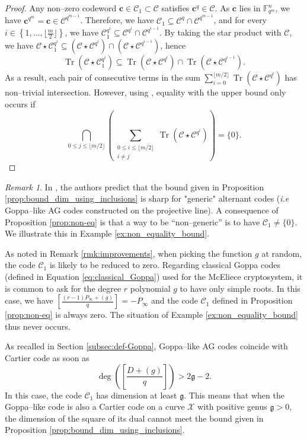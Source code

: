 \documentclass[lettersize,journal]{IEEEtran}
\theoremstyle{plain}
\theoremstyle{definition}
\theoremstyle{remark}
\newtheorem{remark}[thm]{Remark}
\DeclareMathOperator{\trace}{Tr}
\newcommand{\calC}{\mathcal{C}}
\newcommand{\calX}{\mathcal{X}}
\newcommand{\fqm}{\mathbb{F}_{q^m}}
\newcommand{\Tr}[1]{\trace\!\left(#1\right)}
\newcommand{\set}[1]{\left\{#1\right\}}
\begin{document}
	\begin{proof}
		Any non--zero codeword $\mathbf{c} \in  \calC_1 \subset \calC$ satisfies $\mathbf{c}^q \in \calC$. As $\mathbf{c}$ lies in $\fqm^n$, we have $\mathbf{c}^{q^m}=\mathbf{c} \in \calC^{q^{m-1}}$. Therefore,  we have $\calC_1 \subseteq \calC^{q} \cap \calC^{q^{m-1}}$, and for every $i \in \set{1,\dots,\lfloor \frac{m}{2}\rfloor}$, we have $\calC_1^{q^i} \subseteq \calC^{q^i} \cap \calC^{q^{i-1}}$. By taking the star product with $\calC$, we have $\calC \star \calC_1^{q^i} \subseteq \left(\calC \star  \calC^{q^i}\right) \cap \left(\calC \star  \calC^{q^{i-1}}\right)$, hence
		\[\Tr{\calC\star\calC_1^{q^i}} \subseteq \Tr{\calC\star\calC^{q^i}} \cap \Tr{\calC\star\calC^{q^{i-1}}}.\]
		As a result, each pair of consecutive terms in the sum $\sum\limits_{i=0}^{\lfloor m/2 \rfloor} \Tr{\calC \star \calC^{q^i}}$ has non--trivial intersection. However, using \cite[Theorem~2]{T19}, equality with the upper bound only occurs if
		\[\bigcap_{0\leq j \leq \lfloor m/2\rfloor} \left( \sum_{\substack{0\leq i \leq \lfloor m/2 \rfloor\\ i\neq j}} \Tr{\calC \star \calC^{q^i}} \right)= \{0\}.\]
	\end{proof}
	
	\begin{remark}\label{rk:discuss_bound}
		In \cite{FGO+13}, the authors predict that the bound given in Proposition \ref{prop:bound_dim_using_inclusions} is sharp for "generic" alternant codes (\emph{i.e} Goppa--like AG codes constructed on the projective line). A consequence of Proposition \ref{prop:non-eq} is that a way to be ``non--generic'' is to have $\calC_1 \neq \{0\}$. We illustrate this in Example \ref{ex:non_equality_bound}. 	
		
		As noted in Remark \ref{rmk:improvements}, when picking the function $g$ at random, the code $\calC_1$ is likely to be reduced to zero. Regarding classical Goppa codes (defined in Equation \eqref{eq:classical_Goppa}) used for the McEliece cryptosystem, it is common to ask for the degree $r$ polynomial $g$ to have only simple roots. In this case, we have $ \left[ \frac{(r-1)P_\infty+(g)}{q} \right] = -P_\infty$ and the code $\calC_1$ defined in Proposition \ref{prop:non-eq} is always zero. The situation of Example \ref{ex:non_equality_bound} thus never occurs.
		
		As recalled in Section \ref{subsec:def-Goppa}, Goppa--like AG codes coincide with Cartier code as soon as $$\deg\left(\left[ \frac{D+(g)}{q} \right] \right)> 2 \mathfrak{g}-2.$$ In this case, the code $\calC_1$ has dimension at least $\mathfrak{g}$. This means that when the Goppa--like code is also a Cartier code on a curve $\calX$ with positive genus $\mathfrak{g} >0$, the dimension of the square of its dual cannot meet the bound given in Proposition \ref{prop:bound_dim_using_inclusions}.
	\end{remark}
	
\end{document}
